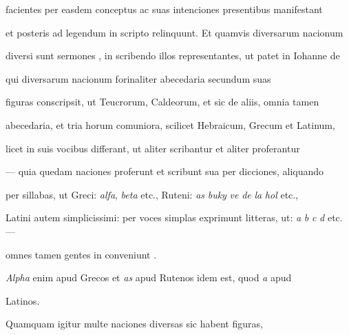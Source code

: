 \begin{VerbatimLatin}[firstnumber=13]
facientes per easdem conceptus ac suas intenciones presentibus manifestant

et posteris ad legendum in scripto relinquunt. Et quamvis diversarum nacionum

diversi sunt sermones , in scribendo illos representantes, ut patet in Iohanne de

 qui diversarum nacionum forinaliter abecedaria secundum suas

figuras conscripsit, ut Teucrorum, Caldeorum, et sic de aliis, omnia tamen

abecedaria, et tria horum comuniora, scilicet Hebraicum, Grecum et Latinum,

licet in suis vocibus differant, ut aliter scribantur et aliter proferantur

— quia quedam naciones proferunt et scribunt sua per dicciones, aliquando

per sillabas, ut Greci: \textit{alfa}, \textit{beta} etc., Ruteni: \textit{as} \textit{buky} \textit{ve} \textit{de} \textit{la} \textit{hol} etc.,

Latini autem simplicissimi: per voces simplas exprimunt litteras, ut: \textit{a} \textit{b} \textit{c} \textit{d} etc. —

omnes tamen gentes in  conveniunt  .

\textit{Alpha} enim apud Grecos et \textit{as} apud Rutenos idem est, quod \textit{a} apud
\end{VerbatimLatin}


\renewcommand{\theFancyVerbLine}{\textcolor{green}{04-25\alph{FancyVerbLine}}}
\begin{VerbatimLatin}[firstnumber=1]
Latinos.

\indentK Quamquam igitur multe naciones diversas sic habent figuras,
\end{VerbatimLatin}

\renewcommand{\theFancyVerbLine}{04-\arabic{FancyVerbLine}\phantom{a}}

